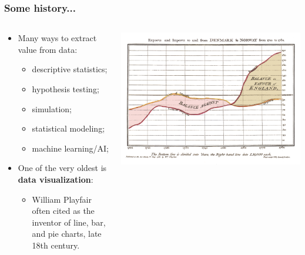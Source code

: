 \documentclass[aspectratio=169]{beamer}
\theoremstyle{principle}
\begin{document}
\begin{frame}
\frametitle{Some history...}

\begin{columns}
\begin{column}{0.5\textwidth}
\begin{itemize}
\item Many ways to extract value from data:
\begin{itemize}
\item descriptive statistics;
\item hypothesis testing;
\item simulation;
\item statistical modeling;
\item machine learning/AI;
\end{itemize}
\bigskip
\bigskip
\item One of the very oldest is \textbf{data visualization}:
\begin{itemize}
\item William Playfair often cited as the inventor of line, bar, and pie charts, late 18th century.
\end{itemize}
\end{itemize}

\end{column}
\begin{column}{0.5\textwidth}
\includegraphics[scale=0.1]{Playfair_TimeSeries-2.png}
\end{column}
\end{columns}

\end{frame}
\end{document}
